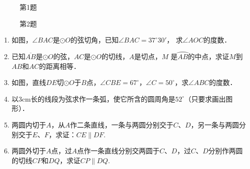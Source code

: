   \begin{figure}[htp]
    \centering
    \begin{minipage}[t]{0.48\textwidth}
    \centering
    \caption*{第1题}
    \end{minipage}
    \begin{minipage}[t]{0.48\textwidth}
    \centering
    \caption*{第2题}
    \end{minipage}
  \end{figure}
  
  
  \begin{ex}
  \begin{enumerate}
    \item 如图，$\angle BAC$是$\odot O$的弦切角，已知$\angle BAC=37^{\circ}30'$，
    求$\angle AOC$的度数．
    \item  已知$\overline{AB}$是$\odot O$的弦，$AC$是$\odot O$的切线，$A$是切点，$M$
    是$\wideparen{AB}$的中点，求证$M$到$AB$和$AC$的距离相等．
    \item  如图，直线$DE$切$\odot O$于$B$点，$\angle CBE=67^{\circ}$，$\angle C=50^{\circ}$，求$\angle ABC$的度数．
    \item  以3cm长的线段为弦求作一条弧，使它所含的圆周角是$52^{\circ}$（只要求画出图形）．
    \item  两圆内切于$A$，从$A$作二条直线，一条与两圆分别交于$C$、$D$，另一条与两圆分别交于$E$、$F$，求证：$CE\parallel DF$.
    \item  两圆外切于$A$点，过$A$点作一条直线分别交两圆于$C$、$D$，过$C$、$D$分别作两圆的切线$CP$和$DQ$，求证$CP\parallel DQ$.
  \end{enumerate}
  \end{ex}
  

